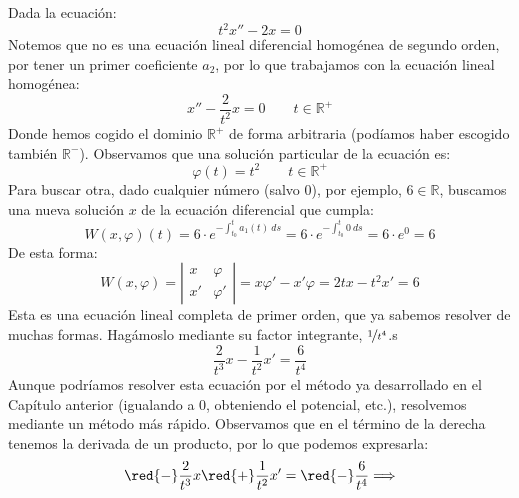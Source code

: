 \begin{ejemplo}
    Dada la ecuación:
    \begin{equation*}
        t^2 x'' - 2x = 0
    \end{equation*}
    Notemos que no es una ecuación lineal diferencial homogénea de segundo orden, por tener un primer coeficiente $a_2$, por lo que trabajamos con la ecuación lineal homogénea:
    \begin{equation*}
        x'' - \dfrac{2}{t^2}x = 0 \qquad t\in \mathbb{R}^+
    \end{equation*}
    Donde hemos cogido el dominio $\mathbb{R}^+$ de forma arbitraria (podíamos haber escogido también $\mathbb{R}^-$). Observamos que una solución particular de la ecuación es:
    \begin{equation*}
        \varphi(t) = t^2 \qquad t\in \mathbb{R}^+
    \end{equation*}
    Para buscar otra, dado cualquier número (salvo 0), por ejemplo, $6\in \mathbb{R}$, buscamos una nueva solución $x$ de la ecuación diferencial que cumpla:
    \begin{equation*}
        W(x,\varphi)(t) = 6 \cdot e^{-\displaystyle \int_{t_0}^{t} a_{1}(t)~ds }= 6 \cdot e^{-\displaystyle \int_{t_0}^{t} 0~ds } = 6\cdot e^0 = 6
    \end{equation*}
    De esta forma:
    \begin{equation*}
        W(x,\varphi) = \left|\begin{array}{cc}
            x & \varphi \\
            x' & \varphi'
        \end{array}\right|
        = x\varphi' - x'\varphi
        = 2tx - t^2 x' = 6
    \end{equation*}
    Esta es una ecuación lineal completa de primer orden, que ya sabemos resolver de muchas formas. Hagámoslo mediante su factor integrante, $\nicefrac{1}{t^4}$.s
    \begin{equation*}
        \dfrac{2}{t^3}x - \dfrac{1}{t^2}x' = \dfrac{6}{t^4}
    \end{equation*}
    Aunque podríamos resolver esta ecuación por el método ya desarrollado en el Capítulo anterior (igualando a $0$, obteniendo el potencial, etc.), resolvemos mediante un método más rápido. Observamos que en el término de la derecha tenemos la derivada de un producto, por lo que podemos expresarla:
    \begin{equation*}
        \red{-}\dfrac{2}{t^3}x \red{+} \dfrac{1}{t^2}x' = \red{-}\dfrac{6}{t^4}
        \Longrightarrow

\end{equation*}
\end{ejemplo}
